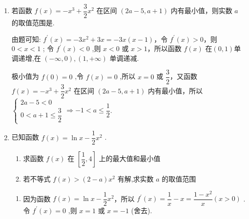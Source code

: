 \begin{enumerate}
\begin{jieda}
        故应有当 $x \leq  0$ 时, $( - \infty ,1\rbrack$ 是 $f\left( x\right)  = {x}^{3} - {3x} + a$ 的值域的子集，又 ${f}^{\prime }\left( x\right)  = 3{x}^{2} - 3 = 3\left( {x + 1}\right) \left( {x - 1}\right)$ ,令 ${f}^{\prime }\left( x\right)  = 0,\therefore x =  - 1$ 或 $x = 1$ (舍去)
        
        当 $x <  - 1$ 时, ${f}^{\prime }\left( x\right)  > 0$ , $f\left( x\right)$ 单调递增；当 $- 1 < x \leq  0$ 时, ${f}^{\prime }\left( x\right)  < 0,f\left( x\right)$ 单调递减
        
        当 $x =  - 1$ 时, $f\left( x\right)$ 取得极大值 $f\left( {-1}\right)  = 2 + a$，故 $f\left( x\right)  = {x}^{3} - {3x} + a\left( {x \leq  0}\right)$ 的值域为 $( - \infty ,2 + a\rbrack$
        
        故$2 + a \geq  1$，故$a \geq   - 1$ .
    \end{jieda}

    
    \item 若函数 $f\left( x\right)  =  -{x}^{3} + \dfrac{3}{2}{x}^{2}$ 在区间 $\left( {{2a} - 5,a + 1}\right)$ 内有最小值，则实数 $a$ 的取值范围是\blkda{$\left(-1, \dfrac{1}{2}\right]$}.
    \begin{jieda}
        由题可知: ${f}^{\prime }\left( x\right)  =  - 3{x}^{2} + {3x} =  - {3x}\left( {x - 1}\right)$，令 ${f}^{\prime }\left( x\right)  > 0$，则 $0 < x < 1$ ; 令 ${f}^{\prime }\left( x\right)  < 0$ ,则 $x < 0$ 或 $x > 1$，所以函数 $f\left( x\right)$ 在$(0,1)$单调递增,在 $\left( {-\infty ,0}\right) ,\left( {1, + \infty }\right)$ 单调递减.
        
        极小值为 $f\left( 0\right)  = 0$ ,令 $f\left( x\right)  = 0$ ,所以 $x = 0$ 或 $\dfrac{3}{2}$，又函数 $f\left( x\right)  =  - {x}^{3} + \dfrac{3}{2}{x}^{2}$ 在区间 $\left( {{2a} - 5,a + 1}\right)$ 内有最小值，所以 $\left\{  \begin{array}{l} {2a} - 5 < 0 \\  0 < a + 1 \leq  \dfrac{3}{2} \end{array}\right.  \Longrightarrow   - 1 < a \leq  \dfrac{1}{2}$.
    \end{jieda}
    
    \item 已知函数 $f\left( x\right)  = \ln x - \dfrac{1}{2}{x}^{2}$ . 
    \begin{enumerate}
        \item 求函数 $f\left( x\right)$ 在 $\left\lbrack  {\dfrac{1}{2},4}\right\rbrack$ 上的最大值和最小值
        \item 若不等式 $f\left( x\right)  > \left( {2 - a}\right) {x}^{2}$ 有解,求实数 $a$ 的取值范围
    \end{enumerate}
    \begin{jieda}
        \begin{enumerate}
            \item 因为函数 $f\left( x\right)  = \ln x - \dfrac{1}{2}{x}^{2}$，所以 ${f}^{\prime }\left( x\right)  = \dfrac{1}{x} - x = \dfrac{1 - {x}^{2}}{x}\left( {x > 0}\right)$ .令 ${f}^{\prime }\left( x\right)  = 0$ ,则 $x = 1$ 或 $x =  - 1$ (舍去).
            

\end{enumerate}
\end{jieda}
\end{enumerate}
